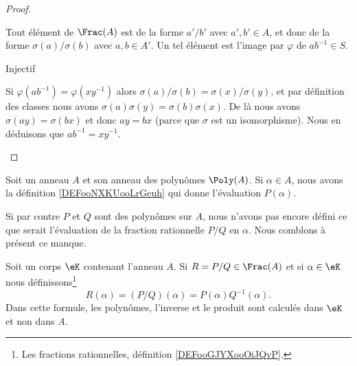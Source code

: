\begin{proof}
\begin{subproof}
            Tout élément de \( \Frac(A)\) est de la forme \( a'/b'\) avec \( a',b'\in A\), et donc de la forme \( \sigma(a)/\sigma(b)\) avec \( a,b\in A'\). Un tel élément est l'image par \( \varphi\) de \( ab^{-1}\in S\).

        \item[Injectif]

            Si \( \varphi(ab^{-1})=\varphi(xy^{-1})\) alors \( \sigma(a)/\sigma(b)=\sigma(x)/\sigma(y)\), et par définition des classes nous avons \( \sigma(a)\sigma(y)=\sigma(b)\sigma(x)\). De là nous avons \( \sigma(ay)=\sigma(bx)\) et donc \( ay=bx\) (parce que \( \sigma\) est un isomorphisme). Nous en déduisons que \( ab^{-1}=xy^{-1}\).
    \end{subproof}
\end{proof}

\begin{normaltext}
    Soit un anneau \( A\) et son anneau des polynômes \( \Poly(A)\). Si \( \alpha\in A\), nous avons la définition \ref{DEFooNXKUooLrGeuh} qui donne l'évaluation \( P(\alpha)\).

    Si par contre \( P\) et \( Q\) sont des polynômes sur \( A\), nous n'avons pas encore défini ce que serait l'évaluation de la fraction rationnelle \( P/Q\) en \( \alpha\). Nous comblons à présent ce manque.
\end{normaltext}

\begin{definition}       \label{DEFooLBIWooCPCaSY}
    Soit un corps \( \eK\) contenant l'anneau \( A\). Si \( R=P/Q\in \Frac(A)\) et si \( \alpha\in \eK\) nous définissons\footnote{Les fractions rationnelles, définition \ref{DEFooGJYXooOiJQvP}.}
    \begin{equation}
        R(\alpha)=(P/Q)(\alpha)=P(\alpha)Q^{-1}(\alpha).
    \end{equation}
    Dans cette formule, les polynômes, l'inverse et le produit sont calculés dans \( \eK\) et non dans \( A\).
\end{definition}

